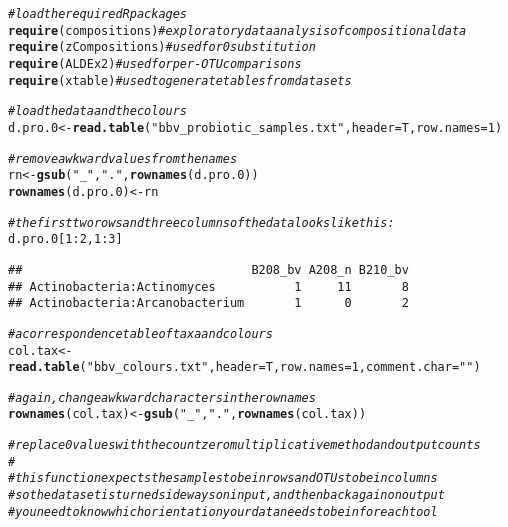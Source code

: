 \documentclass[11pt]{article}\usepackage[]{graphicx}\usepackage[]{color}
\makeatletter
\newcommand{\hlnum}[1]{\textcolor[rgb]{0.686,0.059,0.569}{#1}}%
\newcommand{\hlstr}[1]{\textcolor[rgb]{0.192,0.494,0.8}{#1}}%
\newcommand{\hlcom}[1]{\textcolor[rgb]{0.678,0.584,0.686}{\textit{#1}}}%
\newcommand{\hlopt}[1]{\textcolor[rgb]{0,0,0}{#1}}%
\newcommand{\hlstd}[1]{\textcolor[rgb]{0.345,0.345,0.345}{#1}}%
\newcommand{\hlkwb}[1]{\textcolor[rgb]{0.69,0.353,0.396}{#1}}%
\newcommand{\hlkwc}[1]{\textcolor[rgb]{0.333,0.667,0.333}{#1}}%
\newcommand{\hlkwd}[1]{\textcolor[rgb]{0.737,0.353,0.396}{\textbf{#1}}}%
\newenvironment{kframe}{%
 \def\at@end@of@kframe{}%
 \ifinner\ifhmode%
  \def\at@end@of@kframe{\end{minipage}}%
  \begin{minipage}{\columnwidth}%
 \fi\fi%
 \def\FrameCommand##1{\hskip\@totalleftmargin \hskip-\fboxsep
 \colorbox{shadecolor}{##1}\hskip-\fboxsep
     \hskip-\linewidth \hskip-\@totalleftmargin \hskip\columnwidth}%
 \MakeFramed {\advance\hsize-\width
   \@totalleftmargin\z@ \linewidth\hsize
   \@setminipage}}%
 {\par\unskip\endMakeFramed%
 \at@end@of@kframe}
\newenvironment{knitrout}{}{} %
\makeatother
\begin{document}
\begin{knitrout}
\color{fgcolor}\begin{kframe}
\begin{alltt}
\hlcom{# load the required R packages}
\hlkwd{require}\hlstd{(compositions)} \hlcom{# exploratory data analysis of compositional data}
\hlkwd{require}\hlstd{(zCompositions)} \hlcom{# used for 0 substitution}
\hlkwd{require}\hlstd{(ALDEx2)} \hlcom{# used for per-OTU comparisons}
\hlkwd{require}\hlstd{(xtable)} \hlcom{# used to generate tables from datasets}

\hlcom{# load the data and the colours}
\hlstd{d.pro.0} \hlkwb{<-} \hlkwd{read.table}\hlstd{(}\hlstr{"bbv_probiotic_samples.txt"}\hlstd{,} \hlkwc{header}\hlstd{=T,} \hlkwc{row.names}\hlstd{=}\hlnum{1}\hlstd{)}

\hlcom{# remove awkward values from the names}
\hlstd{rn} \hlkwb{<-} \hlkwd{gsub}\hlstd{(}\hlstr{"_"}\hlstd{,}\hlstr{"."}\hlstd{,} \hlkwd{rownames}\hlstd{(d.pro.0))}
\hlkwd{rownames}\hlstd{(d.pro.0)} \hlkwb{<-} \hlstd{rn}

\hlcom{# the first two rows and three columns of the data looks like this:}
\hlstd{d.pro.0[}\hlnum{1}\hlopt{:}\hlnum{2}\hlstd{,}\hlnum{1}\hlopt{:}\hlnum{3}\hlstd{]}
\end{alltt}
\begin{verbatim}
##                                B208_bv A208_n B210_bv
## Actinobacteria:Actinomyces           1     11       8
## Actinobacteria:Arcanobacterium       1      0       2
\end{verbatim}
\begin{alltt}
\hlcom{# a correspondence table of taxa and colours}
\hlstd{col.tax} \hlkwb{<-} \hlkwd{read.table}\hlstd{(}\hlstr{"bbv_colours.txt"}\hlstd{,} \hlkwc{header}\hlstd{=T,} \hlkwc{row.names}\hlstd{=}\hlnum{1}\hlstd{,} \hlkwc{comment.char}\hlstd{=}\hlstr{""}\hlstd{)}

\hlcom{# again, change awkward characters in the row names}
\hlkwd{rownames}\hlstd{(col.tax)} \hlkwb{<-} \hlkwd{gsub}\hlstd{(}\hlstr{"_"}\hlstd{,}\hlstr{"."}\hlstd{,} \hlkwd{rownames}\hlstd{(col.tax))}

\hlcom{# replace 0 values with the count zero multiplicative method and output counts}
\hlcom{#}
\hlcom{# this function expects the samples to be in rows and OTUs to be in columns }
\hlcom{# so the dataset is turned sideways on input, and then back again on output}
\hlcom{# you need to know which orientation your data needs to be in for each tool}


\end{alltt}
\end{kframe}
\end{knitrout}
\end{document}
